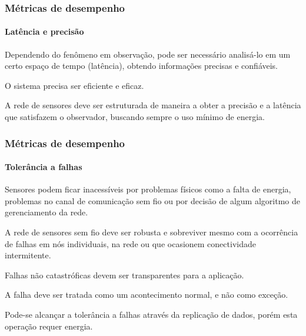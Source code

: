 \documentclass[notes]{beamer}
\begin{document}
\begin{frame}
\label{slide_25}
\frametitle{Métricas de desempenho}
\framesubtitle{Latência e precisão}

\begin{block}

Dependendo do fenômeno em observação, pode ser necessário analisá-lo em um certo espaço de tempo (latência), obtendo informações precisas e confiáveis. 
\end{block} \pause

\begin{block}

O sistema precisa ser eficiente e eficaz.
\end{block} \pause

\begin{block}

A rede de sensores deve ser estruturada de maneira a obter a precisão e a latência que satisfazem o observador, buscando sempre o uso mínimo de energia. 

\end{block}

\end{frame}

\begin{frame}
\label{slide_26}
\frametitle{Métricas de desempenho}
\framesubtitle{Tolerância a falhas}

\begin{block}

Sensores podem ficar inacessíveis por problemas físicos como a falta de energia, problemas no canal de comunicação sem fio ou por decisão de algum algoritmo de gerenciamento da rede.
\end{block} \pause

\begin{alertblock}

A rede de sensores sem fio deve ser robusta e sobreviver mesmo com a ocorrência de falhas em nós individuais, na rede ou que ocasionem conectividade intermitente. 
\end{alertblock} \pause

\begin{alertblock}

Falhas não catastróficas devem ser transparentes para a aplicação. 

\end{alertblock} \pause

\begin{alertblock}

A falha deve ser tratada como um acontecimento normal, e não como exceção.

\end{alertblock} \pause

\begin{block}

Pode-se alcançar a tolerância a falhas através da replicação de dados, porém esta operação requer energia. 
\end{block} 

\end{frame}
\end{document}
